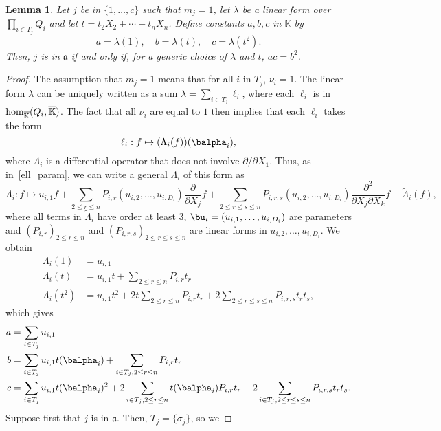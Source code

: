 \documentclass[12pt]{article}
\def\Kbar {{\ensuremath{\overline{\mathbb{K}}}}}
\newtheorem{Lemma}{Lemma}
\begin{document}
\begin{Lemma}\label{lemma:acb2}
  Let $j$ be in $\{1,\dots,c\}$ such that $m_j=1$, let $\lambda$ be a
  linear form over $\prod_{i \in T_j} Q_i$ and let $t=t_2 X_2
  + \cdots + t_n X_n$. Define constants $a,b,c$ in $\Kbar$ by
  $$a=\lambda(1),\quad b=\lambda(t),\quad c=\lambda(t^2).$$
  Then, $j$ is in $\mathfrak{a}$
  if and only if, for a generic choice of $\lambda$ and $t$, $ac=b^2$.
\end{Lemma}
\begin{proof}
  The assumption that $m_j=1$ means that for all $i$ in $T_j$,
  $\nu_i=1$. The linear 
  form $\lambda$ can be uniquely written as a sum $\lambda=\sum_{i \in T_j}
  \ell_i$, where each $\ell_i$ is in ${\rm hom}_\Kbar(Q_i,\Kbar)$.
  The fact that all $\nu_i$ are equal to $1$ then implies that each $\ell_i$ takes the form 
  $$\ell_i: f \mapsto (\Lambda_{i}(f))(\balpha_i),$$
  where $\Lambda_{i}$ is a differential operator that does not 
  involve $\partial/\partial X_1$. Thus, as in~\eqref{ell_param}, we can write a general
  $\Lambda_i$ of this form as
  $$\Lambda_i: f \mapsto u_{i,1} f + \sum_{2 \le r \le n}
  P_{i,r}(u_{i,2},\dots,u_{i,D_i}) \frac{\partial}{\partial X_j} f +
  \sum_{2 \le r \le s \le n} P_{i,r,s}(u_{i,2},\dots,u_{i,D_i})
  \frac{\partial^2}{\partial X_j\partial X_k} f +
  \tilde\Lambda_i(f),$$ where all terms in $\tilde \Lambda_i$ have
  order at least $3$, $\bu_i=(u_{i,1},\dots,u_{i,D_i})$ are parameters and
  $(P_{i,r})_{2 \le r \le n}$ and $(P_{i,r,s})_{2 \le r \le s \le n}$
  are linear forms in $u_{i,2},\dots,u_{i,D_i}$.
We obtain
\begin{align*}
\Lambda_i(1)   &= u_{i,1} \\
\Lambda_i(t)   &= u_{i,1} t +\sum_{2 \le r \le n}P_{i,r}t_r \\
\Lambda_i(t^2) &= u_{i,1} t^2  +2 t \sum_{2 \le r \le n}P_{i,r}t_r   
                                                + 2\sum_{2 \le r \le s \le n} P_{i,r,s}t_rt_s,
\end{align*}
which gives
\begin{align*}
a  &= \sum_{i\in T_j}u_{i,1} \\
b  &= \sum_{i\in T_j}u_{i,1} t(\balpha_i) +\sum_{i \in T_j, 2 \le r \le n}P_{i,r}t_r \\
c &= \sum_{i\in T_j}u_{i,1} t(\balpha_i)^2  +2  \sum_{i \in T_j, 2 \le r \le n}t(\balpha_i) P_{i,r}t_r    
                                                +2 \sum_{i \in T_j, 2 \le r \le s \le n} P_{i,r,s}t_rt_s.
\end{align*}
Suppose first that $j$ is in $\mathfrak{a}$. Then, $T_j=\{\sigma_j\}$, so we 

\end{proof}
\end{document}
